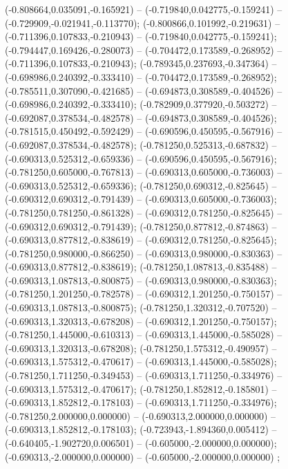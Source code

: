 (-0.808664,0.035091,-0.165921) -- (-0.719840,0.042775,-0.159241) -- (-0.729909,-0.021941,-0.113770);
 (-0.800866,0.101992,-0.219631) -- (-0.711396,0.107833,-0.210943) -- (-0.719840,0.042775,-0.159241);
 (-0.794447,0.169426,-0.280073) -- (-0.704472,0.173589,-0.268952) -- (-0.711396,0.107833,-0.210943);
 (-0.789345,0.237693,-0.347364) -- (-0.698986,0.240392,-0.333410) -- (-0.704472,0.173589,-0.268952);
 (-0.785511,0.307090,-0.421685) -- (-0.694873,0.308589,-0.404526) -- (-0.698986,0.240392,-0.333410);
 (-0.782909,0.377920,-0.503272) -- (-0.692087,0.378534,-0.482578) -- (-0.694873,0.308589,-0.404526);
 (-0.781515,0.450492,-0.592429) -- (-0.690596,0.450595,-0.567916) -- (-0.692087,0.378534,-0.482578);
 (-0.781250,0.525313,-0.687832) -- (-0.690313,0.525312,-0.659336) -- (-0.690596,0.450595,-0.567916);
 (-0.781250,0.605000,-0.767813) -- (-0.690313,0.605000,-0.736003) -- (-0.690313,0.525312,-0.659336);
 (-0.781250,0.690312,-0.825645) -- (-0.690312,0.690312,-0.791439) -- (-0.690313,0.605000,-0.736003);
 (-0.781250,0.781250,-0.861328) -- (-0.690312,0.781250,-0.825645) -- (-0.690312,0.690312,-0.791439);
 (-0.781250,0.877812,-0.874863) -- (-0.690313,0.877812,-0.838619) -- (-0.690312,0.781250,-0.825645);
 (-0.781250,0.980000,-0.866250) -- (-0.690313,0.980000,-0.830363) -- (-0.690313,0.877812,-0.838619);
 (-0.781250,1.087813,-0.835488) -- (-0.690313,1.087813,-0.800875) -- (-0.690313,0.980000,-0.830363);
 (-0.781250,1.201250,-0.782578) -- (-0.690312,1.201250,-0.750157) -- (-0.690313,1.087813,-0.800875);
 (-0.781250,1.320312,-0.707520) -- (-0.690313,1.320313,-0.678208) -- (-0.690312,1.201250,-0.750157);
 (-0.781250,1.445000,-0.610313) -- (-0.690313,1.445000,-0.585028) -- (-0.690313,1.320313,-0.678208);
 (-0.781250,1.575312,-0.490957) -- (-0.690313,1.575312,-0.470617) -- (-0.690313,1.445000,-0.585028);
 (-0.781250,1.711250,-0.349453) -- (-0.690313,1.711250,-0.334976) -- (-0.690313,1.575312,-0.470617);
 (-0.781250,1.852812,-0.185801) -- (-0.690313,1.852812,-0.178103) -- (-0.690313,1.711250,-0.334976);
 (-0.781250,2.000000,0.000000) -- (-0.690313,2.000000,0.000000) -- (-0.690313,1.852812,-0.178103);
 (-0.723943,-1.894360,0.005412) -- (-0.640405,-1.902720,0.006501) -- (-0.605000,-2.000000,0.000000);
 (-0.690313,-2.000000,0.000000) -- (-0.605000,-2.000000,0.000000) ;
